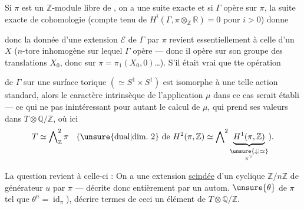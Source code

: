 Si \(\pi\) est un \(\mathbb Z\)-module libre de
, on a une suite exacte
et si \(\Gamma\) opère sur \(\pi\), la suite exacte de cohomologie
(compte tenu de \(H^i(\Gamma,\pi\otimes_{\mathbb Z}\mathbb R)=0\)
pour \(i>0\)) donne

donc la donnée d'une extension \(\mathcal E\) de \(\Gamma\) par \(\pi\)
revient essentiellement à celle d'un
 \(X\)
(\(n\)-tore inhomogène sur lequel \(\Gamma\) opère --- donc il opère
sur son groupe des translations \(X_0\), donc sur
\(\pi=\pi_1(X_0,0)\)\ldots).
S'il était vrai  que tte opération


de \(\Gamma\) sur une surface torique \((\simeq S^1\times S^1)\)
est isomorphe à une telle action standard, alors le caractère
intrinsèque de l'application \(\mu\) dans ce cas serait établi
--- ce qui ne  pas inintéressant pour autant le calcul
de \(\mu\), qui prend ses valeurs dans
\(T\otimes\mathbb Q/\mathbb Z\), où ici
\[
T\simeq\bigwedge\nolimits_{\mathbb Z}^{2}\pi
\quad
(\text{\unsure{dual|dim.\ 2} de }H^2(\pi,\mathbb Z)\simeq
\bigwedge\nolimits^{2}
\underbrace{H^1(\pi,\mathbb Z)}_{
\substack{\unsure{\downarrow|\simeq}\\ \pi^\vee}}).
\]

La question revient à celle-ci : On a une extension \uline{scindée}
d'un  cyclique
\(\mathbb Z/n\mathbb Z\) de générateur \(u\) par \(\pi\)
--- décrite donc entièrement par un autom.
 \(\unsure{\theta}\) de \(\pi\) tel que
\(\theta^n=\operatorname{id}_\pi\)), décrire  termes de
ceci un élément de \(T\otimes\mathbb Q/\mathbb Z\).

